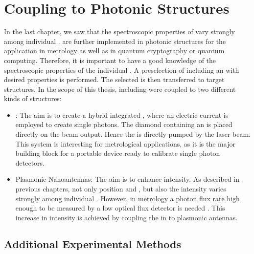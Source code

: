
\chapter[Coupling NDs]{Coupling \Nds to Photonic Structures}	\label{ch::coupling}

	In the last chapter, we saw that the spectroscopic properties of \sivs vary strongly among individual \nds.
	\Nds are further implemented in photonic structures for the application in metrology as well as in quantum cryptography or quantum computing.
	Therefore, it is important to have a good knowledge of the spectroscopic properties of the individual  \siv.
	A preselection of \nds including an \siv with desired properties is performed.
	The selected \nd is then transferred to target structures.
	In the scope of this thesis, \nds including \sivs were coupled to two different kinds of structures:
	\begin{itemize}
		\item \Vcsels: The aim is to create a hybrid-integrated \sps, where an electric current is employed to create single photons. The diamond containing an \siv is placed directly on the beam output. Hence the \siv is directly pumped by the laser beam. This system is interesting for metrological applications, as it is the major building block for a portable device ready to calibrate single photon detectors.
		\item Plasmonic Nanoantennas: The aim is to enhance \pl intensity. As described in previous chapters, not only \ZPL position and \lw, but also the \pl intensity varies strongly among individual \sivs. However, in metrology a photon flux rate high enough to be measured by a low optical flux detector is needed \cite{Vaigu2017}. This increase in intensity is achieved by coupling the \sivs in \nds to plasmonic antennas.
	\end{itemize}

	\section{Additional Experimental Methods}



